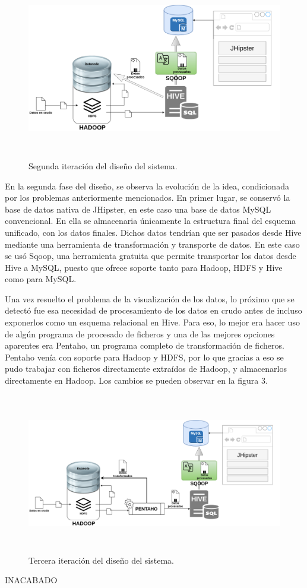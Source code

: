 \begin{figure}[H]
    \centering
    \includegraphics[width=1\textwidth,height=8cm]{Imagenes/Dis_Fig_2}
    \caption{Segunda iteración del diseño del sistema.}
    \label{fig:dis_2_sist}
\end{figure}
\par


En la segunda fase del diseño, se observa la evolución de la idea, condicionada por los problemas anteriormente mencionados. En primer lugar, se conservó la base de datos nativa de JHipster, en este caso una base de datos MySQL convencional. En ella se almacenaria únicamente la estructura final del esquema unificado, con los datos finales. Dichos datos tendrían que ser pasados desde Hive mediante una herramienta de transformación y transporte de datos. En este caso se usó Sqoop, una herramienta gratuita que permite transportar los datos desde Hive a MySQL, puesto que ofrece soporte tanto para Hadoop, HDFS y Hive como para MySQL. \par
Una vez resuelto el problema de la visualización de los datos, lo próximo que se detectó fue esa necesidad de procesamiento de los datos en crudo antes de incluso exponerlos como un esquema relacional en Hive. Para eso, lo mejor era hacer uso de algún programa de procesado de ficheros y una de las mejores opciones aparentes era Pentaho, un programa completo de transformación de ficheros. Pentaho venía con soporte para Hadoop y HDFS, por lo que gracias a eso se pudo trabajar con ficheros directamente extraídos de Hadoop, y almacenarlos directamente en Hadoop. Los cambios se pueden observar en la figura 3. \par


\begin{figure}[H]
    \centering
    \includegraphics[width=1\textwidth,height=7cm]{Imagenes/Dis_Fig_3}
    \caption{Tercera iteración del diseño del sistema.}
    \label{fig:dis_2_sist}
\end{figure}
\par


INACABADO

